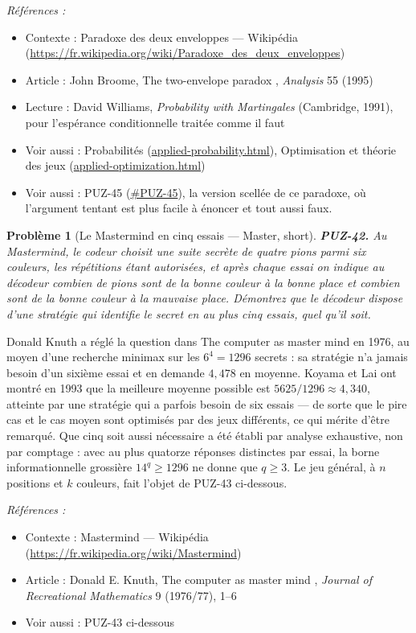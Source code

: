 \documentclass[11pt]{article}
\newtheorem{problem}{Problème}
\newenvironment{refs}{\par\small\noindent\emph{Références :}\begin{itemize}\setlength\itemsep{0pt}}{\end{itemize}\normalsize}
\begin{document}
\begin{refs}
\item Contexte : Paradoxe des deux enveloppes --- Wikipédia (\url{https://fr.wikipedia.org/wiki/Paradoxe_des_deux_enveloppes})
\item Article : John Broome, \og{} The two-envelope paradox \fg{}, \textit{Analysis} 55 (1995)
\item Lecture : David Williams, \textit{Probability with Martingales} (Cambridge, 1991), pour l'espérance conditionnelle traitée comme il faut
\item Voir aussi : Probabilités (\url{applied-probability.html}), Optimisation et théorie des jeux (\url{applied-optimization.html})
\item Voir aussi : PUZ-45 (\url{#PUZ-45}), la version scellée de ce paradoxe, où l'argument tentant est plus facile à énoncer et tout aussi faux.
\end{refs}

\bigskip

\begin{problem}[{Le Mastermind en cinq essais --- Master, short}]
\textbf{PUZ-42.} Au Mastermind, le codeur choisit une suite secrète de
quatre pions parmi six couleurs, les répétitions étant autorisées, et après chaque essai on
indique au décodeur combien de pions sont de la bonne couleur à la bonne place et combien
sont de la bonne couleur à la mauvaise place. Démontrez que le décodeur dispose d'une
stratégie qui identifie le secret en au plus cinq essais, quel qu'il soit.
\end{problem}

\noindent Donald Knuth a réglé la question dans \og{} The computer as master mind \fg{} en
1976, au moyen d'une recherche minimax sur les $ 6^4 = 1296 $ secrets : sa stratégie n'a
jamais besoin d'un sixième essai et en demande $ 4{,}478 $ en moyenne. Koyama et Lai ont
montré en 1993 que la meilleure moyenne possible est $ 5625/1296 \approx 4{,}340 $,
atteinte par une stratégie qui a parfois besoin de six essais --- de sorte que le pire cas et le
cas moyen sont optimisés par des jeux différents, ce qui mérite d'être remarqué. Que cinq
soit aussi nécessaire a été établi par analyse exhaustive, non par comptage : avec au plus
quatorze réponses distinctes par essai, la borne informationnelle grossière
$ 14^{q} \ge 1296 $ ne donne que $ q \ge 3 $. Le jeu général, à $ n $ positions et
$ k $ couleurs, fait l'objet de PUZ-43 ci-dessous.

\begin{refs}
\item Contexte : Mastermind --- Wikipédia (\url{https://fr.wikipedia.org/wiki/Mastermind})
\item Article : Donald E. Knuth, \og{} The computer as master mind \fg{}, \textit{Journal of Recreational Mathematics} 9 (1976/77), 1--6
\item Voir aussi : PUZ-43 ci-dessous
\end{refs}
\end{document}
